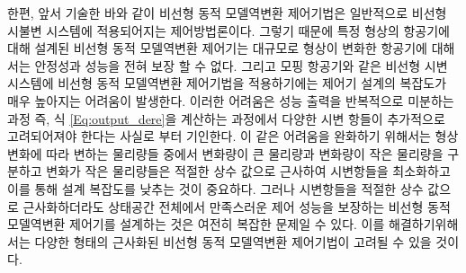 \documentclass[a4paper, 12pt]{report}
\begin{document}
한편, 앞서 기술한 바와 같이 비선형 동적 모델역변환 제어기법은 일반적으로 비선형 시불변 시스템에 적용되어지는 제어방법론이다. 그렇기 때문에 특정 형상의 항공기에 대해 설계된 비선형 동적 모델역변환 제어기는 대규모로 형상이 변화한 항공기에 대해서는 안정성과 성능을 전혀 보장 할 수 없다. 그리고 모핑 항공기와 같은 비선형 시변 시스템에 비선형 동적 모델역변환 제어기법을 적용하기에는 제어기 설계의 복잡도가 매우 높아지는 어려움이 발생한다. 이러한 어려움은 성능 출력을 반복적으로 미분하는 과정 즉, 식 \eqref{Eq:output_dere}을 계산하는 과정에서 다양한 시변 항들이 추가적으로 고려되어져야 한다는 사실로 부터 기인한다. 이 같은 어려움을 완화하기 위해서는 형상 변화에 따라 변하는 물리량들 중에서 변화량이 큰 물리량과 변화량이 작은 물리량을 구분하고 변화가 작은 물리량들은 적절한 상수 값으로 근사하여 시변항들을 최소화하고 이를 통해 설계 복잡도를 낮추는 것이 중요하다. 그러나 시변항들을 적절한 상수 값으로 근사화하더라도 상태공간 전체에서 만족스러운 제어 성능을 보장하는 비선형 동적 모델역변환 제어기를 설계하는 것은 여전히 복잡한 문제일 수 있다. 이를 해결하기위해서는 다양한 형태의 근사화된 비선형 동적 모델역변환 제어기법이 고려될 수 있을 것이다.

	
	\printbibliography
	
\end{document}

